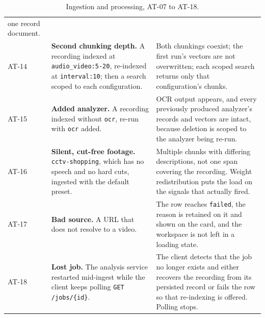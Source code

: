 \documentclass[11pt,a4paper]{article}
\begin{document}
\begin{table}[htbp]
\begin{tabularx}{\textwidth}{@{}L{0.85cm}XX@{}}
one record document. \\
AT-14 & \textbf{Second chunking depth.} A recording indexed at
\texttt{audio\_video:5-20}, re-indexed at \texttt{interval:10}; then a search scoped to
each configuration. &
Both chunkings coexist; the first run's vectors are not overwritten; each scoped search
returns only that configuration's chunks. \\
AT-15 & \textbf{Added analyzer.} A recording indexed without \texttt{ocr}, re-run with
\texttt{ocr} added. &
OCR output appears, and every previously produced analyzer's records and vectors are
intact, because deletion is scoped to the analyzer being re-run. \\
AT-16 & \textbf{Silent, cut-free footage.} \texttt{cctv-shopping}, which has no speech and no hard
cuts, ingested with the default preset. &
Multiple chunks with differing descriptions, not one span covering the recording. Weight
redistribution puts the load on the signals that actually fired. \\
AT-17 & \textbf{Bad source.} A URL that does not resolve to a video. &
The row reaches \texttt{failed}, the reason is retained on it and shown on the card, and
the workspace is not left in a loading state. \\
AT-18 & \textbf{Lost job.} The analysis service restarted mid-ingest while the client keeps
polling \texttt{GET /jobs/\{id\}}. &
The client detects that the job no longer exists and either recovers the recording from its
persisted record or fails the row so that re-indexing is offered. Polling stops. \\
\bottomrule
\end{tabularx}
\caption{Ingestion and processing, AT-07 to AT-18.}
\end{table}
\end{document}
